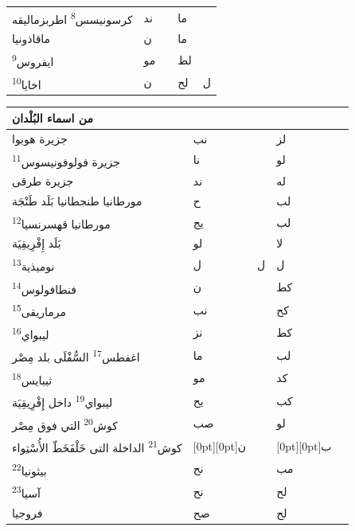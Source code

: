 \documentclass[11pt]{article}
\begin{document}
\begin{Arabic}
\begin{minipage}[t]{0.495\textwidth}
\begin{tabular}{|p{55mm}|>{\centering\arraybackslash}p{4.8mm}>{\centering\arraybackslash}p{4.8mm}|>{\centering\arraybackslash}p{4.8mm}>{\centering\arraybackslash}p{4.8mm}|}
{}كرسونيسس\textsuperscript{8} اطربزماليقه & ند &  & ما &  \\
{}ماقاذونيا & ن &  & ما &  \\
{}ايفروس\textsuperscript{9} & مو &  & لط &  \\
{}اخايا\textsuperscript{10} & ن &  & لح & ل \\
\hline\end{tabular}\end{minipage}\hfill\begin{minipage}[t]{0.495\textwidth}\setlength{\tabcolsep}{2.2pt}\begin{tabular}{|p{55mm}|>{\centering\arraybackslash}p{4.8mm}>{\centering\arraybackslash}p{4.8mm}|>{\centering\arraybackslash}p{4.8mm}>{\centering\arraybackslash}p{4.8mm}|}\hline
\centering من اسماء البُلْدان & \multicolumn{2}{c|}{الطول} & \multicolumn{2}{c|}{العرض} \\ \hline
{}جزيرة هوبوا & نب &  & لز &  \\
{}جزيرة فولوفونيسوس\textsuperscript{11} & نا &  & لو &  \\
{}جزيرة طرقى & ند &  & له &  \\
{}مورطانيا طنجطانيا بَلَد طَنْجَة & ح &  & لب &  \\
{}مورطانيا قهسرنسيا\textsuperscript{12} & يج &  & لب &  \\
{}بَلَد إِفْرِيقِيَة & لو &  & لا &  \\
{}نوميذية\textsuperscript{13} & ل & ل & ل &  \\
{}فنطافولوس\textsuperscript{14} & ن &  & كط &  \\
{}مرماريقى\textsuperscript{15} & نب &  & كح &  \\
{}ليبواي\textsuperscript{16} & نز &  & كط &  \\
{}اغفطس\textsuperscript{17} السُّفْلَى بلد مِصْر & ما &  & لب &  \\
{}ثيبايس\textsuperscript{18} & مو &  & كد &  \\
{}ليبواي\textsuperscript{19} داخل إِفْرِيقِيَة & يح &  & كب &  \\
{}كوش\textsuperscript{20} التي فوق مِصْر & صب &  & لو &  \\
{}كوش\textsuperscript{21} الداخلة التى خَلْفَ\newline خَطّ الأُسْتِواء & \raisebox{-1\normalbaselineskip}[0pt][0pt]{ن} &  & \raisebox{-1\normalbaselineskip}[0pt][0pt]{ب} &  \\
{}بيثونيا\textsuperscript{22} & نح &  & مب &  \\
{}آسيا\textsuperscript{23} & نح &  & لح &  \\
{}فروجيا & صح &  & لح &  \\
\hline\end{tabular}\end{minipage}
\end{Arabic}
\end{document}
